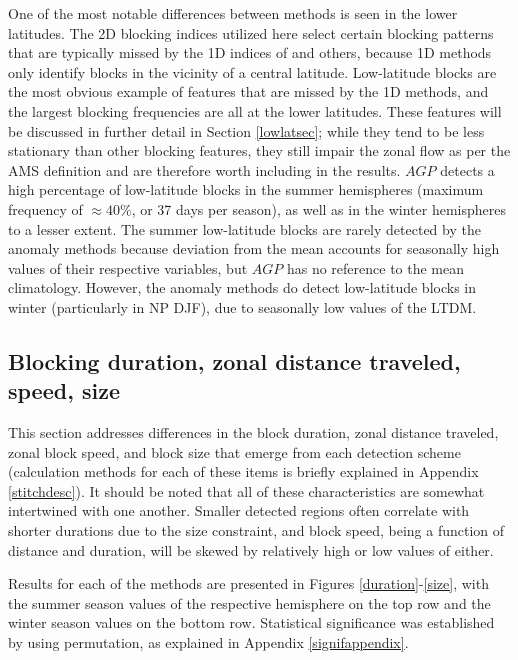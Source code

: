 \documentclass[smallextended]{svjour3}       %
\numberwithin{equation}{section}
\begin{document}
One of the most notable differences between methods is seen in the lower latitudes. The 2D blocking indices utilized here select certain blocking patterns that are typically missed by the 1D indices of \cite{tibaldi_operational_1990} and others, because  1D methods only identify blocks in the vicinity of a central latitude. Low-latitude blocks are the most obvious example of features that are missed by the 1D methods, and the largest blocking frequencies are all at the lower latitudes. These features will be discussed in further detail in Section \ref{lowlatsec}; while they tend to be less stationary than other blocking features, they still impair the zonal flow as per the AMS definition and are therefore worth including in the results. $AGP$ detects a high percentage of low-latitude blocks in the summer hemispheres (maximum frequency of $\approx 40\%$, or 37 days per season), as well as in the winter hemispheres to a lesser extent. The summer low-latitude blocks are rarely detected by the anomaly methods because deviation from the mean accounts for seasonally high values of their respective variables, but $AGP$ has no reference to the mean climatology. However, the anomaly methods do detect low-latitude blocks in winter (particularly in NP DJF), due to seasonally low values of the LTDM.


\subsection{Blocking duration, zonal distance traveled, speed, size}\label{blockingmetrics}

This section addresses differences in the block duration, zonal distance traveled, zonal block speed, and block size that emerge from each detection scheme (calculation methods for each of these items is briefly explained in Appendix \ref{stitchdesc}).  It should be noted that all of these characteristics are somewhat intertwined with one another. Smaller detected regions often correlate with shorter durations due to the size constraint, and block speed, being a function of distance and duration, will be skewed by relatively high or low values of either. 

Results for each of the methods are presented in Figures \ref{duration}-\ref{size}, with the summer season values of the respective hemisphere on the top row and the winter season values on the bottom row. Statistical significance was established by using permutation, as explained in Appendix \ref{signifappendix}.
\end{document}
